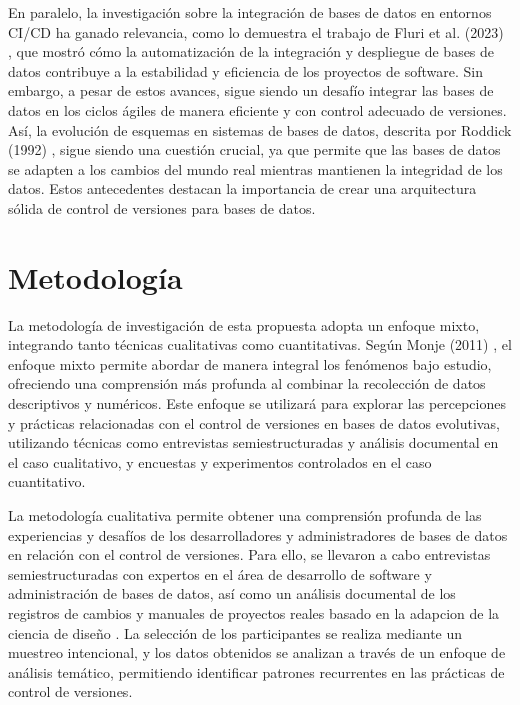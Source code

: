 \documentclass{IEEEtran}
\begin{document}
En paralelo, la investigación sobre la integración de bases de datos en entornos CI/CD ha ganado relevancia, como lo demuestra el trabajo de Fluri et al. (2023) \cite{fluri2023measuring}, que mostró cómo la automatización de la integración y despliegue de bases de datos contribuye a la estabilidad y eficiencia de los proyectos de software. Sin embargo, a pesar de estos avances, sigue siendo un desafío integrar las bases de datos en los ciclos ágiles de manera eficiente y con control adecuado de versiones. Así, la evolución de esquemas en sistemas de bases de datos, descrita por Roddick (1992) \cite{roddick1992schema}, sigue siendo una cuestión crucial, ya que permite que las bases de datos se adapten a los cambios del mundo real mientras mantienen la integridad de los datos. Estos antecedentes destacan la importancia de crear una arquitectura sólida de control de versiones para bases de datos.

\section{Metodología}
La metodología de investigación de esta propuesta adopta un enfoque mixto, integrando tanto técnicas cualitativas como cuantitativas. Según Monje (2011) \cite{Monje2011}, el enfoque mixto permite abordar de manera integral los fenómenos bajo estudio, ofreciendo una comprensión más profunda al combinar la recolección de datos descriptivos y numéricos. Este enfoque se utilizará para explorar las percepciones y prácticas relacionadas con el control de versiones en bases de datos evolutivas, utilizando técnicas como entrevistas semiestructuradas y análisis documental en el caso cualitativo, y encuestas y experimentos controlados en el caso cuantitativo.

La metodología cualitativa permite obtener una comprensión profunda de las experiencias y desafíos de los desarrolladores y administradores de bases de datos en relación con el control de versiones. Para ello, se llevaron a cabo entrevistas semiestructuradas con expertos en el área de desarrollo de software y administración de bases de datos, así como un análisis documental de los registros de cambios y manuales de proyectos reales basado en la adapcion de la ciencia de diseño \cite{RoblesVasquezNaranjo}. La selección de los participantes se realiza mediante un muestreo intencional, y los datos obtenidos se analizan a través de un enfoque de análisis temático, permitiendo identificar patrones recurrentes en las prácticas de control de versiones.
\end{document}
